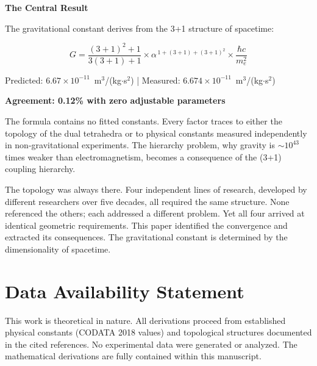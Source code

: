 \documentclass[aps,prd,preprint,superscriptaddress,showpacs,preprintnumbers,amsmath,amssymb,nofootinbib]{revtex4-2}
\begin{document}
\vspace{1.5em}
\noindent
\colorbox{resultgreen}{\parbox{\dimexpr\textwidth-2\fboxsep\relax}{%
\vspace{0.8em}
\centering
\textbf{\large The Central Result}

\vspace{0.5em}
The gravitational constant derives from the 3+1 structure of spacetime:

\vspace{0.3em}
\boldmath
\begin{equation}
G = \frac{(3+1)^2 + 1}{3(3+1) + 1} \times \alpha^{\,1 + (3+1) + (3+1)^2} \times \frac{\hbar c}{m_e^2}
\end{equation}
\unboldmath

\vspace{0.3em}
Predicted: $6.67 \times 10^{-11}$~m$^3$/(kg$\cdot$s$^2$) | Measured: $6.674 \times 10^{-11}$~m$^3$/(kg$\cdot$s$^2$)

\textbf{Agreement: 0.12\% with zero adjustable parameters}
\vspace{0.5em}
}}

\vspace{1.5em}

The formula contains no fitted constants. Every factor traces to either the topology of the dual tetrahedra or to physical constants measured independently in non-gravitational experiments. The hierarchy problem, why gravity is $\sim 10^{43}$ times weaker than electromagnetism, becomes a consequence of the (3+1) coupling hierarchy.

The topology was always there. Four independent lines of research, developed by different researchers over five decades, all required the same structure. None referenced the others; each addressed a different problem. Yet all four arrived at identical geometric requirements. This paper identified the convergence and extracted its consequences. The gravitational constant is determined by the dimensionality of spacetime.

\section*{Data Availability Statement}

This work is theoretical in nature. All derivations proceed from established physical constants (CODATA 2018 values) and topological structures documented in the cited references. No experimental data were generated or analyzed. The mathematical derivations are fully contained within this manuscript.
\end{document}
